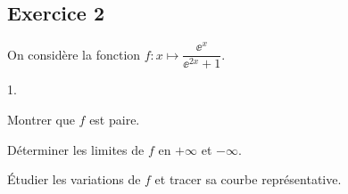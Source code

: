 \documentclass[11pt]{article}%
\begin{document}
\subsection*{Exercice 2}
\noindent
  On considère la fonction $f : x \mapsto \dfrac{\ee^x}{\ee^{2x}+1}$.
  \begin{noliste}{1.}
  \item Montrer que $f$ est paire.
  \item Déterminer les limites de $f$ en $+\infty$ et $-\infty$.
  \item Étudier les variations de $f$ et tracer sa courbe
    représentative.
  \end{noliste}
\end{document}

